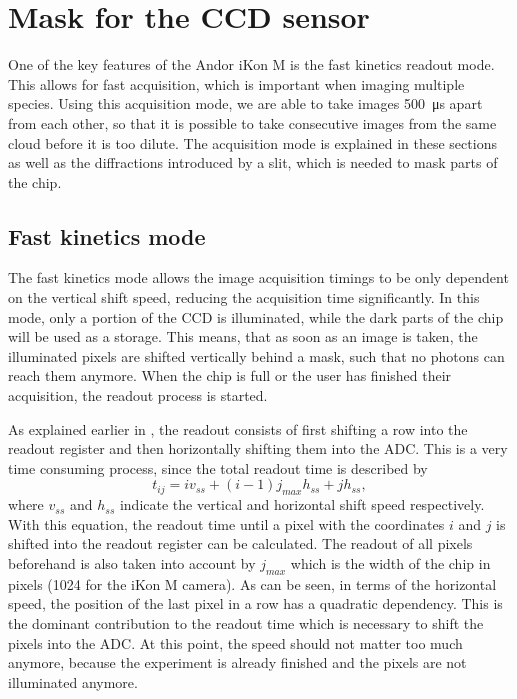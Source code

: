
\section{Mask for the CCD sensor}
One of the key features of the Andor iKon M is the fast kinetics readout mode. This allows for fast acquisition, which is important when imaging multiple species. Using this acquisition mode, we are able to take images \SI{500}{\micro\second} apart from each other, so that it is possible to take consecutive images from the same cloud before it is too dilute.
The acquisition mode is explained in these sections as well as the diffractions introduced by a slit, which is needed to mask parts of the chip.

\subsection{Fast kinetics mode}
\label{ch:fast_kin}
The fast kinetics mode allows the image acquisition timings to be only dependent on the vertical shift speed, reducing the acquisition time significantly. In this mode, only a portion of the CCD is illuminated, while the dark parts of the chip will be used as a storage. This means, that as soon as an image is taken, the illuminated pixels are shifted vertically behind a mask, such that no photons can reach them anymore. When the chip is full or the user has finished their acquisition, the readout process is started.

As explained earlier in , the readout consists of first shifting a row into the readout register and then horizontally shifting them into the ADC. This is a very time consuming process, since the total readout time is described by
\begin{equation}
t_{ij} = i v_{ss} + (i-1) j_{max} h_{ss}+j h_{ss},
\end{equation}
where $v_{ss}$ and $h_{ss}$ indicate the vertical and horizontal shift speed respectively.
With this equation, the readout time until a pixel with the coordinates $i$ and $j$ is shifted into the readout register can be calculated. The readout of all pixels beforehand is also taken into account by $j_{max}$ which is the width of the chip in pixels (1024 for the iKon M camera).
As can be seen, in terms of the horizontal speed, the position of the last pixel in a row has a quadratic dependency. This is the dominant contribution to the readout time which is necessary to shift the pixels into the ADC. At this point, the speed should not matter too much anymore, because the experiment is already finished and the pixels are not illuminated anymore.

